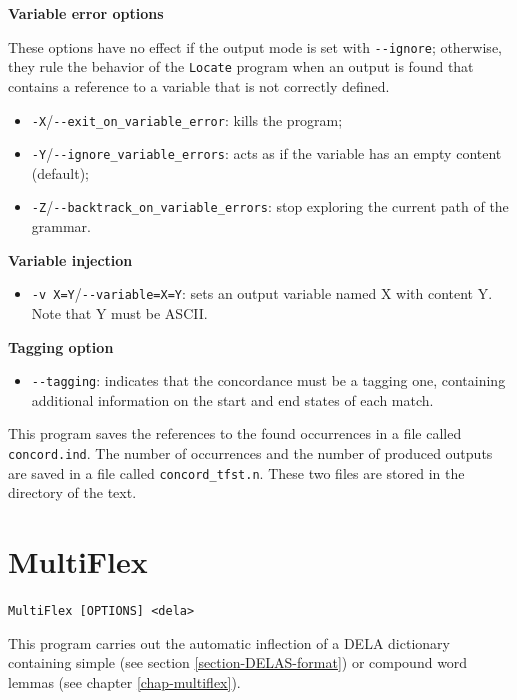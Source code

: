 \bigskip
\noindent \textbf{Variable error options}

\noindent These options have no effect if the output mode is set with
\verb+--ignore+; otherwise, they rule the behavior of the \verb+Locate+ program
when an output is found that contains a reference to a variable that is not correctly defined.
\begin{itemize}
  \item \verb+-X+/\verb+--exit_on_variable_error+: kills the program;
  \item \verb+-Y+/\verb+--ignore_variable_errors+: acts as if the variable has
  an empty content (default);
  \item \verb+-Z+/\verb+--backtrack_on_variable_errors+: stop exploring the
  current path of the grammar.
\end{itemize}
\noindent \textbf{Variable injection}
\begin{itemize}
  \item \verb+-v X=Y+/\verb+--variable=X=Y+: sets an output variable named X with content Y. 
  Note that Y must be ASCII.
\end{itemize}
\noindent \textbf{Tagging option}
\begin{itemize}
  \item \verb+--tagging+: indicates that the concordance must be a tagging one, containing
  additional information on the start and end states of each match.
\end{itemize}
\bigskip
\noindent {}This 
program saves the references to the found occurrences in a file called
\verb+concord.ind+. The number of occurrences and the number of produced outputs
are saved in a file called \verb+concord_tfst.n+. These two files are stored in the
directory of the text.







\section{MultiFlex}
\verb+MultiFlex [OPTIONS] <dela>+

\bigskip
\noindent {}This 
program carries out the automatic inflection of a DELA dictionary 
containing simple (see section \ref{section-DELAS-format}) or compound word
lemmas (see chapter \ref{chap-multiflex}).

